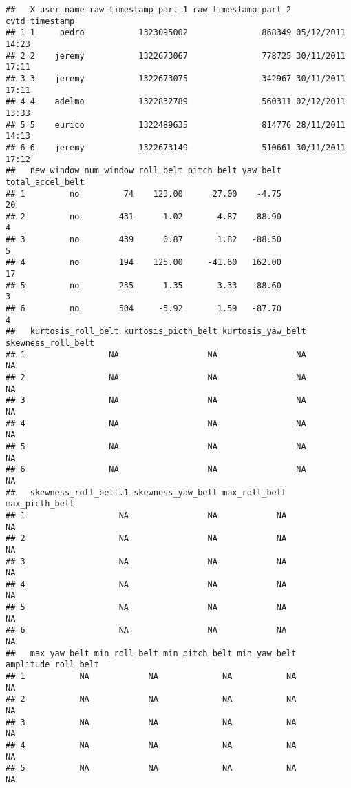 \documentclass[]{article}
\begin{document}
\begin{verbatim}
##   X user_name raw_timestamp_part_1 raw_timestamp_part_2   cvtd_timestamp
## 1 1     pedro           1323095002               868349 05/12/2011 14:23
## 2 2    jeremy           1322673067               778725 30/11/2011 17:11
## 3 3    jeremy           1322673075               342967 30/11/2011 17:11
## 4 4    adelmo           1322832789               560311 02/12/2011 13:33
## 5 5    eurico           1322489635               814776 28/11/2011 14:13
## 6 6    jeremy           1322673149               510661 30/11/2011 17:12
##   new_window num_window roll_belt pitch_belt yaw_belt total_accel_belt
## 1         no         74    123.00      27.00    -4.75               20
## 2         no        431      1.02       4.87   -88.90                4
## 3         no        439      0.87       1.82   -88.50                5
## 4         no        194    125.00     -41.60   162.00               17
## 5         no        235      1.35       3.33   -88.60                3
## 6         no        504     -5.92       1.59   -87.70                4
##   kurtosis_roll_belt kurtosis_picth_belt kurtosis_yaw_belt skewness_roll_belt
## 1                 NA                  NA                NA                 NA
## 2                 NA                  NA                NA                 NA
## 3                 NA                  NA                NA                 NA
## 4                 NA                  NA                NA                 NA
## 5                 NA                  NA                NA                 NA
## 6                 NA                  NA                NA                 NA
##   skewness_roll_belt.1 skewness_yaw_belt max_roll_belt max_picth_belt
## 1                   NA                NA            NA             NA
## 2                   NA                NA            NA             NA
## 3                   NA                NA            NA             NA
## 4                   NA                NA            NA             NA
## 5                   NA                NA            NA             NA
## 6                   NA                NA            NA             NA
##   max_yaw_belt min_roll_belt min_pitch_belt min_yaw_belt amplitude_roll_belt
## 1           NA            NA             NA           NA                  NA
## 2           NA            NA             NA           NA                  NA
## 3           NA            NA             NA           NA                  NA
## 4           NA            NA             NA           NA                  NA
## 5           NA            NA             NA           NA                  NA

\end{verbatim}
\end{document}
